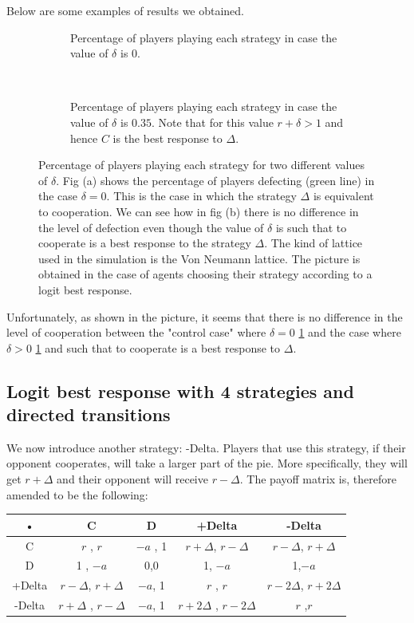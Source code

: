 \documentclass{article}
\begin{document}
Below are some examples of results we obtained.
\begin{figure}[htbp] 
\centering
\begin{subfigure}[t]{0.47\textwidth}
  \centering
  \caption{Percentage of players playing each strategy in case the value of $\delta$ is 0.}
  \label{fig:BR_nodelta} 
\end{subfigure}%
~
~
\begin{subfigure}[t]{0.47\textwidth}
  \centering
  \caption{Percentage of players playing each strategy in case the value of $\delta$ is $0.35$. Note that for this value $r+\delta >1$ and hence $C$ is the best response to $\Delta$.}
  \label{fig:BR_delta} 
\end{subfigure}
\caption{Percentage of players playing each strategy for two different values of $\delta$.
Fig (a) shows the percentage of players defecting (green line) in the case $\delta =0$. This is the case in which the strategy $\Delta$ is equivalent to cooperation.
We can see how in fig (b) there is no difference in the level of defection even though the value of $\delta$ is such that to cooperate is a best response to the strategy $\Delta$.
The kind of lattice used in the simulation is the Von Neumann lattice.
The picture is obtained in the case of agents choosing their strategy according to a logit best response.
}
\label{fig:BR}
\end{figure} 

Unfortunately, as shown in the picture, it seems that there is no difference in the level of cooperation between the "control case" where $\delta=0$ \ref{fig:BR_nodelta} and the case where $\delta>0$  \ref{fig:BR_nodelta} and such that to cooperate is a best response to $\Delta$.


\subsection{Logit best response with 4 strategies and directed transitions}
We now introduce another strategy: -Delta. Players that use this strategy, if their opponent cooperates, will take a larger part of the pie. More specifically, they will get $r+\Delta$ and their opponent will receive $r-\Delta$. The payoff matrix is, therefore amended to be the following:
\begin{center}
\begin{tabular}{|c|c|c|c|c|}
\hline 
• & C & D &+Delta & -Delta  \\ 
\hline 
C & $r$ , $r$ & $-a$ , 1 & $r+\Delta$, $r-\Delta$ & $r-\Delta$, $r+\Delta$ \\ 
\hline 
D & 1 , $-a$ & 0,0 & 1, $-a$ & 1,$-a$\\ 
\hline 
+Delta & $r -\Delta$, $r+\Delta$ & $-a$, 1 & $r$ , $r$& $r-2\Delta$, $r+2\Delta$ \\ 
\hline 
-Delta & $r+\Delta$ , $r-\Delta$ & $-a$, 1 & $r+2\Delta$ , $r-2\Delta$ & $r$ ,$ r$\\ 
\hline 
\end{tabular} 
\end{center}
\end{document}
